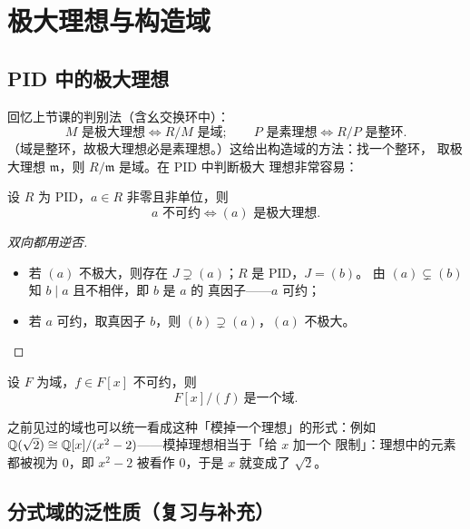 \section{极大理想与构造域}\label{sec:maximal}

\subsection{PID 中的极大理想}

回忆上节课的判别法（含幺交换环中）：
\[
  M\text{ 是极大理想} \iff R/M\text{ 是域}; \qquad
  P\text{ 是素理想} \iff R/P\text{ 是整环}.
\]
（域是整环，故极大理想必是素理想。）这给出构造域的方法：找一个整环，
取极大理想 $\mathfrak{m}$，则 $R/\mathfrak{m}$ 是域。在 PID 中判断极大
理想非常容易：

\begin{theorem}
设 $R$ 为 PID，$a\in R$ 非零且非单位，则
\[
  a\text{ 不可约} \iff (a)\text{ 是极大理想}.
\]
\end{theorem}

\begin{proof}[双向都用逆否]
\leavevmode
\begin{itemize}[leftmargin=1.3em,itemsep=2pt]
  \item 若 $(a)$ 不极大，则存在 $J\supsetneq(a)$；$R$ 是 PID，$J = (b)$。
        由 $(a)\subsetneq(b)$ 知 $b\mid a$ 且不相伴，即 $b$ 是 $a$ 的
        真因子——$a$ 可约；
  \item 若 $a$ 可约，取真因子 $b$，则 $(b)\supsetneq(a)$，$(a)$ 不极大。
\end{itemize}
\end{proof}

\begin{corollary}[模掉不可约多项式得到域]
设 $F$ 为域，$f\in F[x]$ 不可约，则
\[
  F[x]/(f)\ \text{是一个域}.
\]
\end{corollary}

\begin{remark}[统一的观点]
之前见过的域也可以统一看成这种「模掉一个理想」的形式：例如
$\mathbb{Q}(\sqrt{2})\cong\mathbb{Q}[x]/(x^2-2)$——模掉理想相当于「给 $x$ 加一个
限制」：理想中的元素都被视为 $0$，即 $x^2 - 2$ 被看作 $0$，于是 $x$
就变成了 $\sqrt{2}$。
\end{remark}

\subsection{分式域的泛性质（复习与补充）}

